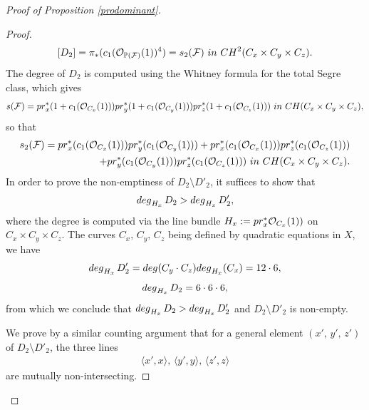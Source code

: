 \documentclass[10pt,a4paper]{amsart}
\begin{document}
\begin{proof}[Proof of Proposition \ref{prodominant}]
\begin{proof}
$$[D_2]=\pi_* (c_1(\mathcal{O}_{\mathbb{P}(\mathcal{F})}(1))^4)=s_2(\mathcal{F})\,\,{\rm in}\,\,{\rm CH}^2(C_x\times C_y\times C_z).$$
The degree  of $D_2$ is computed using the Whitney formula for  the total Segre class, which gives
$$ s(\mathcal{F})={\rm pr}_x^*( 1+c_1(\mathcal{O}_{C_x}(1))){\rm pr}_y^*( 1+c_1(\mathcal{O}_{C_y}(1))){\rm pr}_z^*( 1+c_1(\mathcal{O}_{C_z}(1))) \,\,{\rm in}\,\,{\rm CH}(C_x\times C_y\times C_z),$$
so that
\begin{eqnarray} \label{eqpoursegre2} s_2(\mathcal{F})={\rm pr}_x^*(c_1(\mathcal{O}_{C_x}(1))){\rm pr}_y^*( c_1(\mathcal{O}_{C_y}(1)))+{\rm pr}_x^*(c_1(\mathcal{O}_{C_x}(1))){\rm pr}_z^*(c_1(\mathcal{O}_{C_z}(1)))\\
\nonumber +{\rm pr}_y^*(c_1(\mathcal{O}_{C_y}(1))){\rm pr}_z^*(c_1(\mathcal{O}_{C_z}(1))) \,\,{\rm in}\,\,{\rm CH}(C_x\times C_y\times C_z).
\end{eqnarray}
In order  to prove the non-emptiness of $D_2\setminus D'_2$, it suffices to  show that
$${\rm deg}_{H_x}\,D_2> {\rm deg}_{H_x}\,D'_2,$$ where the degree is computed via the line bundle $H_x:={\rm pr}_x^*\mathcal{O}_{C_x}(1))$ on $C_x\times C_y\times C_z$.
The curves $C_x,\,C_y,\,C_z$ being defined by quadratic equations in $X$, we have  $${\rm deg}_{H_x}\,D'_2={\rm deg}(C_y\cdot C_z){\rm deg}_{H_x}(C_x)=12\cdot 6,$$
$${\rm deg}_{H_x}\,D_2=6\cdot 6\cdot 6,$$
from which we conclude that ${\rm deg}_{H_x}\,D_2> {\rm deg}_{H_x}\,D'_2$ and $D_2\setminus D'_2$ is non-empty.

We prove by a similar counting argument that for a general element $(x',\,y',\,z')$ of $D_2\setminus D'_2$, the three lines \begin{eqnarray}\label{eq3lines}\langle x',x\rangle, \,\langle y',y\rangle, \,\langle z',z\rangle \end{eqnarray} are mutually non-intersecting.





\end{proof}
\end{proof}
\end{document}
